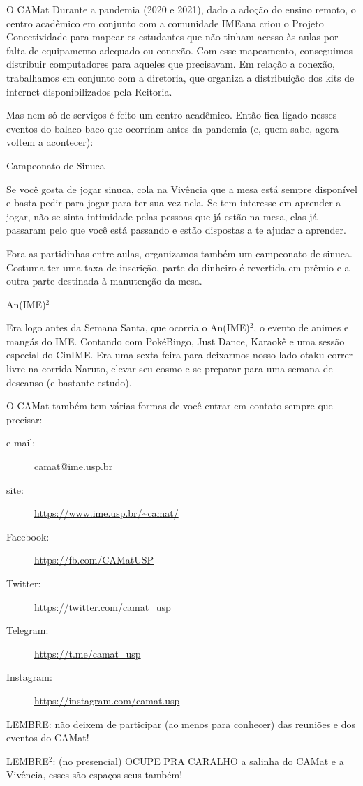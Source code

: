 \begin{secao}{O CAMat}
Durante a pandemia (2020 e 2021), dado a adoção do ensino remoto, o centro acadêmico em
conjunto com a comunidade IMEana criou o Projeto Conectividade para mapear es estudantes que não tinham
acesso às aulas por falta de equipamento adequado ou conexão. Com esse mapeamento, conseguimos distribuir computadores para aqueles que
precisavam. Em relação a conexão, trabalhamos em conjunto com a diretoria, que organiza a distribuição dos kits de internet disponibilizados pela Reitoria.
  
Mas nem só de serviços é feito um centro acadêmico. Então fica ligado nesses
eventos do balaco-baco que ocorriam antes da pandemia (e, quem sabe, agora voltem a acontecer):

\begin{subsecao}{Campeonato de Sinuca}

Se você gosta de jogar sinuca, cola na Vivência que a mesa está sempre disponível
e basta pedir para jogar para ter sua vez nela. Se tem interesse em aprender a jogar,
não se sinta intimidade pelas pessoas que já estão na mesa, elas já passaram pelo
que você está passando e estão dispostas a te ajudar a aprender.

Fora as partidinhas entre aulas, organizamos também um campeonato de sinuca. Costuma
ter uma taxa de inscrição, parte do dinheiro é revertida em prêmio e a outra parte
destinada à manutenção da mesa.

\end{subsecao}

\begin{subsecao}{An(IME)$^2$}

Era logo antes da Semana Santa, que ocorria o An(IME)$^2$, o evento de animes e
mangás do IME. Contando com PokéBingo, Just Dance, Karaokê e uma sessão especial do CinIME.
Era uma sexta-feira para deixarmos nosso lado otaku correr livre na corrida Naruto,
elevar seu cosmo e se preparar para uma semana de descanso (e bastante estudo).

\end{subsecao}


O CAMat também tem várias formas de você entrar em contato sempre que precisar:

\begin{description}
\item [e-mail:] camat@ime.usp.br
\item [site:] \url{https://www.ime.usp.br/~camat/}
\item [Facebook:] \url{https://fb.com/CAMatUSP}
\item [Twitter:] \url{https://twitter.com/camat_usp}
\item [Telegram:] \url{https://t.me/camat_usp}
\item [Instagram:] \url{https://instagram.com/camat.usp}
\end{description}

LEMBRE: não deixem de participar (ao menos para conhecer) das reuniões e dos eventos do CAMat!

LEMBRE$^2$: (no presencial) OCUPE PRA CARALHO a salinha do CAMat e a Vivência,
esses são espaços seus também!

\end{secao}
